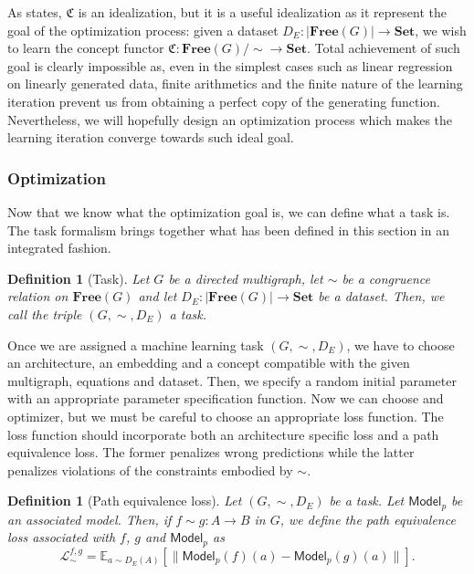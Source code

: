 \documentclass[11pt,a4paper,openright,twoside]{report}
\theoremstyle{plain}
\newtheorem{definition}[proposition]{Definition}
\theoremstyle{definition}
\begin{document}
As \cite{gavranovicLearningFunctorsUsing2020} states, $\mathfrak{C}$ is an idealization, but it is a useful idealization as it represent the goal of the optimization process: given a dataset $D_E: |\mathbf{Free}(G)| \to \mathbf{Set}$, we wish to learn the concept functor $\mathfrak{C}: \mathbf{Free}(G)/{\sim} \to \mathbf{Set}$. Total achievement of such goal is clearly impossible as, even in the simplest cases such as linear regression on linearly generated data, finite arithmetics and the finite nature of the learning iteration prevent us from obtaining a perfect copy of the generating function.
Nevertheless, we will hopefully design an optimization process which makes the learning iteration converge towards such ideal goal.

\subsubsection{Optimization}

Now that we know what the optimization goal is, we can define what a task is. The task formalism brings together what has been defined in this section in an integrated fashion.

\begin{definition}[Task]
  Let $G$ be a directed multigraph, let ${\sim}$ be a congruence relation on $\mathbf{Free}(G)$ and let $D_E: |\mathbf{Free}(G)| \to \mathbf{Set}$ be a dataset. Then, we call the triple $(G,{\sim},D_E)$ a task.
\end{definition}

Once we are assigned a machine learning task $(G,{\sim},D_E)$, we have to choose an architecture, an embedding and a concept compatible with the given multigraph, equations and dataset. Then, we specify a random initial parameter with an appropriate parameter specification function. Now we can choose and optimizer, but we must be careful to choose an appropriate loss function. The loss function should incorporate both an architecture specific loss and a path equivalence loss. The former penalizes wrong predictions while the latter penalizes violations of the constraints embodied by ${\sim}$.

\begin{definition}[Path equivalence loss]
  Let $(G,{\sim},D_E)$ be a task. Let $\mathsf{Model}_p$ be an associated model. Then, if $f \sim g: A \to B$ in $G$, we define the path equivalence loss associated with $f$, $g$ and $\mathsf{Model}_p$ as 
  \[\mathcal{L}_{\sim}^{f,g} = \mathbb{E}_{a \sim D_E(A)}[\|\mathsf{Model}_p(f)(a) - \mathsf{Model}_p(g)(a)\|].\]  
\end{definition}
\end{document}
